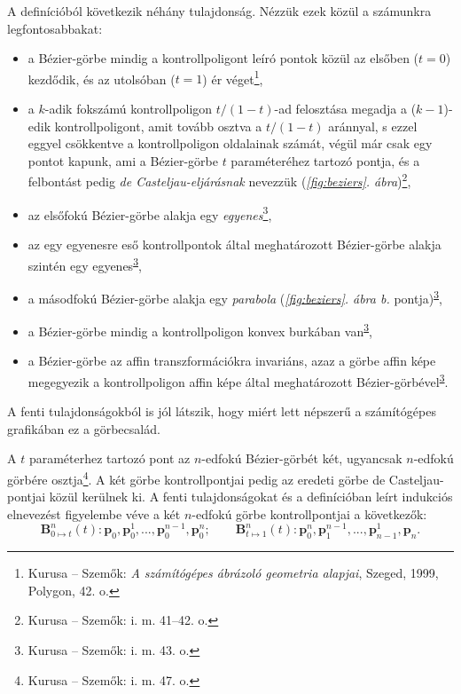 \documentclass[12pt]{report}
\theoremstyle{definition}
\begin{document}
A definícióból következik néhány tulajdonság. Nézzük ezek közül a számunkra
legfontosabbakat:
\begin{itemize}[noitemsep,topsep=0pt]
  \item a Bézier-görbe mindig a kontrollpoligont leíró pontok közül az elsőben
  ($t=0$) kezdődik, és az utolsóban ($t=1$) ér véget\footnote{Kurusa -- Szemők:
  \emph{A számítógépes ábrázoló geometria alapjai}, Szeged, 1999, Polygon, 42.
  o.},
  \item a $k$-adik fokszámú kontrollpoligon $t/(1-t)$-ad felosztása megadja a
  ($k-1$)-edik kontrollpoligont, amit tovább osztva a $t/(1-t)$ aránnyal, s
  ezzel eggyel csökkentve a kontrollpoligon oldalainak számát, végül már csak
  egy pontot kapunk, ami a Bézier-görbe $t$ paraméteréhez tartozó pontja, és a
  felbontást pedig \emph{de Casteljau-eljárásnak} nevezzük
  (\emph{\ref{fig:beziers}. ábra})\footnote{Kurusa -- Szemők: i. m. 41--42.
  o.},
  \item az elsőfokú Bézier-görbe alakja egy \emph{egyenes}\footnote{Kurusa --
  Szemők: i. m. 43. o.\label{fn:Kurusa:43p}},
  \item az egy egyenesre eső kontrollpontok által meghatározott Bézier-görbe
  alakja szintén egy egyenes\textsuperscript{\ref{fn:Kurusa:43p}},

  \item a másodfokú Bézier-görbe alakja egy \emph{parabola}
  (\emph{\ref{fig:beziers}. ábra b.}
  pontja)\textsuperscript{\ref{fn:Kurusa:43p}},

  \item a Bézier-görbe mindig a kontrollpoligon konvex burkában
  van\textsuperscript{\ref{fn:Kurusa:43p}},

  \item a Bézier-görbe az affin transzformációkra invariáns, azaz a görbe affin
  képe megegyezik a kontrollpoligon affin képe által meghatározott
  Bézier-görbével\textsuperscript{\ref{fn:Kurusa:43p}}.
\end{itemize}

A fenti tulajdonságokból is jól látszik, hogy miért lett népszerű a számítógépes
grafikában ez a görbecsalád.

A $t$ paraméterhez tartozó pont az $n$-edfokú Bézier-görbét két, ugyancsak
$n$-edfokú görbére osztja\footnote{Kurusa -- Szemők: i. m. 47. o.}. A két görbe
kontrollpontjai pedig az eredeti görbe de Casteljau-pontjai közül kerülnek ki.
A fenti tulajdonságokat és a definícióban leírt indukciós elnevezést figyelembe
véve a két $n$-edfokú görbe kontrollpontjai a következők:
\begin{equation}\label{eq:1} \boldsymbol{B}_{0\mapsto t}^n(t):
\boldsymbol{p}_0, \boldsymbol{p}_0^1, ..., \boldsymbol{p}_0^{n-1},
\boldsymbol{p}_0^n; \qquad \boldsymbol{B}_{t\mapsto 1}^n(t):
\boldsymbol{p}_0^n, \boldsymbol{p}_1^{n-1}, ..., \boldsymbol{p}_{n-1}^1,
\boldsymbol{p}_n. \end{equation}
\end{document}
